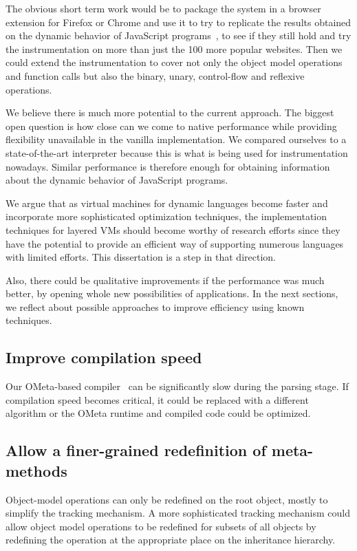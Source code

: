 The obvious short term work would be to package the system in a browser
extension for Firefox or Chrome and use it to try to replicate the results
obtained on the dynamic behavior of JavaScript programs~\cite{behavior_js}, to
see if they still hold and try the instrumentation on more than just the 100
more popular websites. Then we could extend the instrumentation to cover not
only the object model operations and function calls but also the binary, unary,
control-flow and reflexive operations.

We believe there is much more potential to the current approach. The
biggest open question is how close can we come to native performance while
providing flexibility unavailable in the vanilla implementation. We compared
ourselves to a state-of-the-art interpreter because this is what is being used
for instrumentation nowadays. Similar performance is therefore enough for
obtaining information about the dynamic behavior of JavaScript programs. 

We argue that as virtual machines for dynamic languages become faster and
incorporate more sophisticated optimization techniques, the implementation
techniques for layered VMs should become worthy of research efforts since they
have the potential to provide an efficient way of supporting numerous languages
with limited efforts. This dissertation is a step in that direction.

Also, there could be qualitative improvements if the performance was much
better, by opening whole new possibilities of applications.  In the next
sections, we reflect about possible approaches to improve efficiency
using known techniques.

\subsection{Improve compilation speed}

Our OMeta-based compiler~\cite{Warth:2007} can be significantly slow during the
parsing stage. If compilation speed becomes critical, it could be replaced with
a different algorithm or the OMeta runtime and compiled code could be
optimized.

\subsection{Allow a finer-grained redefinition of meta-methods}

Object-model operations can only be redefined on the root object, mostly to
simplify the tracking mechanism. A more sophisticated tracking mechanism could
allow object model operations to be redefined for subsets of all objects by
redefining the operation at the appropriate place on the inheritance hierarchy.


